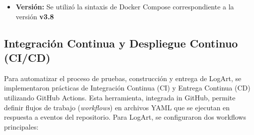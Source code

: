 \begin{itemize}
\begin{itemize}
\begin{itemize}
\begin{itemize}
                                    \item \texttt{mongo}: El contenedor de la base de datos MongoDB, utilizando una imagen oficial.
                                \end{itemize}
                            \item Se implementaron \textbf{healthcheck} para ambos servicios. El servicio \texttt{mongo} verifica su estado mediante un ping a la base de datos, y el servicio \texttt{app} mediante una petición a un endpoint \texttt{health}, asegurando un arranque ordenado y la disponibilidad de los servicios.
                            \item Se utilizó para levantar y detener todo el entorno con los comandos \texttt{docker-compose up} y \texttt{docker-compose down}.
                        \end{itemize}
                    Este enfoque se detalla en la entrada del Blog ``Docker y Docker Compose en LogArt: Simplificando el desarrollo y despliegue''\cite{MorenoDockerLogArt}.

                    \item \textbf{Versión:} Se utilizó la sintaxis de Docker Compose correspondiente a la versión \textbf{v3.8} 
                \end{itemize}
                
    \end{itemize}

\subsection{Integración Continua y Despliegue Continuo (CI/CD)}
\label{sec:cicd}

Para automatizar el proceso de pruebas, construcción y entrega de LogArt, se implementaron prácticas de Integración Continua (CI) y Entrega Continua (CD) utilizando GitHub Actions. Esta herramienta, integrada in GitHub, permite definir flujos de trabajo (\textit{workflows}) en archivos YAML que se ejecutan en respuesta a eventos del repositorio. Para LogArt, se configuraron dos workflows principales:

